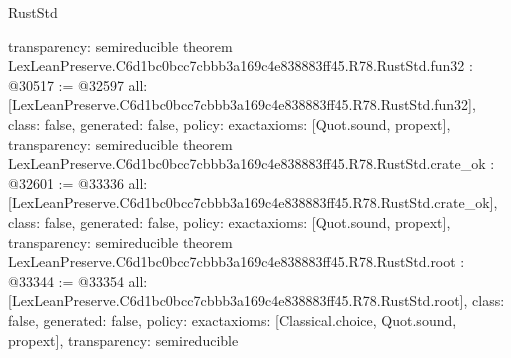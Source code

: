\begin{lexlean}{RustStd}
\begin{coremodule}
{  transparency: semireducible
}
theorem LexLeanPreserve.C6d1bc0bcc7cbbb3a169c4e838883ff45.R78.RustStd.fun32 : @30517 := @32597 {
  all: [LexLeanPreserve.C6d1bc0bcc7cbbb3a169c4e838883ff45.R78.RustStd.fun32],
  class: false,
  generated: false,
  policy: exact{axioms: [Quot.sound, propext]},
  transparency: semireducible
}
theorem LexLeanPreserve.C6d1bc0bcc7cbbb3a169c4e838883ff45.R78.RustStd.crate_ok : @32601 := @33336 {
  all: [LexLeanPreserve.C6d1bc0bcc7cbbb3a169c4e838883ff45.R78.RustStd.crate_ok],
  class: false,
  generated: false,
  policy: exact{axioms: [Quot.sound, propext]},
  transparency: semireducible
}
theorem LexLeanPreserve.C6d1bc0bcc7cbbb3a169c4e838883ff45.R78.RustStd.root : @33344 := @33354 {
  all: [LexLeanPreserve.C6d1bc0bcc7cbbb3a169c4e838883ff45.R78.RustStd.root],
  class: false,
  generated: false,
  policy: exact{axioms: [Classical.choice, Quot.sound, propext]},
  transparency: semireducible
}


\end{coremodule}
\end{lexlean}
